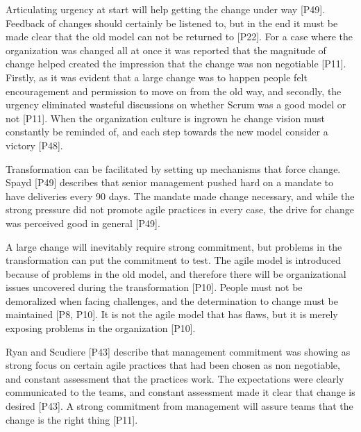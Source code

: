 
Articulating urgency at start will help getting the change under way [P49].
Feedback of changes should certainly be listened to, but in the end it must be
made clear that the old model can not be returned to [P22].
For a case where the organization was changed all at once it was reported that
the magnitude of change helped created the impression that the change was non
negotiable [P11]. Firstly, as it was evident that a large change was to happen
people felt encouragement and permission to move on from the old way, and
secondly, the urgency eliminated wasteful discussions on whether Scrum was a
good model or not [P11].
When the organization culture is ingrown he change vision must constantly be
reminded of, and each step towards the new model consider a victory [P48].


Transformation can be facilitated by setting up mechanisms that force change.
Spayd [P49] describes that senior management pushed hard on a mandate to have
deliveries every 90 days. The mandate made change necessary, and while the
strong pressure did not promote agile practices in every case, the drive for
change was perceived good in general [P49].


A large change will inevitably require strong commitment, but problems in the
transformation can put the commitment to test. The agile model is introduced
because of problems in the old model, and therefore there will be organizational
issues uncovered during the transformation [P10]. People must not be demoralized
when facing challenges, and the determination to change must be maintained [P8,
P10]. It is not the agile model that has flaws, but it is merely exposing
problems in the organization [P10].

Ryan and Scudiere [P43] describe that management commitment was showing as
strong focus on certain agile practices that had been chosen as non negotiable,
and constant assessment that the practices work. The expectations were clearly
communicated to the teams, and constant assessment made it clear that change is
desired [P43].
A strong commitment from management will assure teams that the change is the
right thing [P11].



